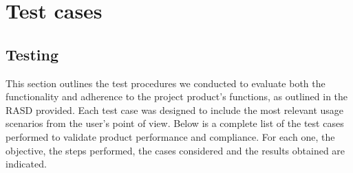 \chapter{Test cases}

\section{Testing}
This section outlines the test procedures we conducted to evaluate both the functionality and adherence to the project product's functions, as outlined in the RASD provided.
Each test case was designed to include the most relevant usage scenarios from the user's point of view.
Below is a complete list of the test cases performed to validate product performance and compliance.
For each one, the objective, the steps performed, the cases considered and the results obtained are indicated.

